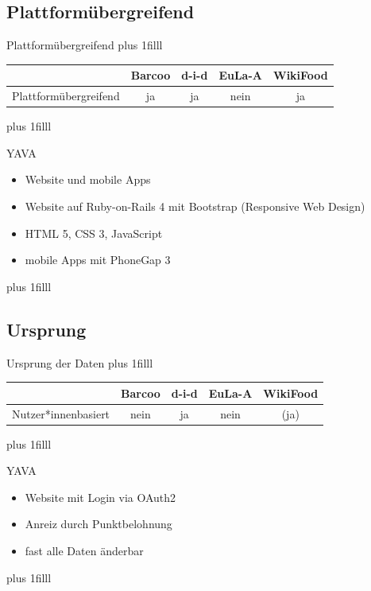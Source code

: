 \documentclass{beamer}
\begin{document}
\subsection*{Plattformübergreifend}
\begin{frame}{Plattformübergreifend}
	\vskip0pt plus 1filll
		\begin{tabular}{|c|c|c|c|c|}
				\hline
				& Barcoo & d-i-d & EuLa-A & WikiFood\\
				\hline
				Plattformübergreifend & ja & ja & nein & ja\\
				\hline
	\end{tabular}
	\vskip0pt plus 1filll


	\begin{exampleblock}{YAVA}
	\begin{itemize}
			\item Website und mobile Apps
			\item Website auf Ruby-on-Rails 4
					mit Bootstrap (Responsive Web Design)
			\item HTML 5, CSS 3, JavaScript
			\item mobile Apps mit PhoneGap 3
	\end{itemize}
	\end{exampleblock}
	\vskip0pt plus 1filll
\end{frame}

\subsection*{Ursprung}
\begin{frame}{Ursprung der Daten}
	\vskip0pt plus 1filll
		\begin{tabular}{|c|c|c|c|c|}
				\hline
				& Barcoo & d-i-d & EuLa-A & WikiFood\\
				\hline
				Nutzer*innenbasiert & nein & ja & nein & (ja)\\
				\hline
	\end{tabular}
	\vskip0pt plus 1filll

	\begin{exampleblock}{YAVA}
	\begin{itemize}
		\item Website mit Login via OAuth2
		\item Anreiz durch Punktbelohnung
		\item fast alle Daten änderbar
	\end{itemize}
	\end{exampleblock}
	\vskip0pt plus 1filll
\end{frame}
\end{document}
